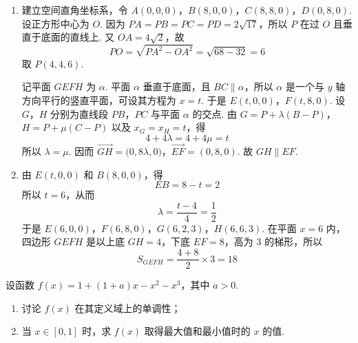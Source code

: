 \begin{solution}
\begin{enumerate}
\item 建立空间直角坐标系，令
\(A(0,0,0)\)，\(B(8,0,0)\)，\(C(8,8,0)\)，\(D(0,8,0)\).
设正方形中心为 \(O\). 因为 \(PA=PB=PC=PD=2\sqrt{17}\)，所以 \(P\) 在过 \(O\) 且垂直于底面的直线上. 又 \(OA=4\sqrt{2}\)，故
\[
PO=\sqrt{PA^2-OA^2}=\sqrt{68-32}=6
\]
取 \(P(4,4,6)\).

记平面 \(GEFH\) 为 \(\alpha\). 平面 \(\alpha\) 垂直于底面，且 \(BC\parallel\alpha\)，所以 \(\alpha\) 是一个与 \(y\) 轴方向平行的竖直平面，可设其方程为 \(x=t\). 于是
\(E(t,0,0)\)，\(F(t,8,0)\).
设 \(G\)，\(H\) 分别为直线段 \(PB\)，\(PC\) 与平面 \(\alpha\) 的交点. 由
\(G=P+\lambda(B-P)\)，\(H=P+\mu(C-P)\)
以及 \(x_G=x_H=t\)，得
\[
4+4\lambda=4+4\mu=t
\]
所以 \(\lambda=\mu\). 因而
\(\overrightarrow{GH} =\bigl(0,8\lambda,0\bigr)\)，\(\overrightarrow{EF}=(0,8,0)\).
故 \(GH\parallel EF\).

\item 由 \(E(t,0,0)\) 和 \(B(8,0,0)\)，得
\[
EB=8-t=2
\]
所以 \(t=6\)，从而
\[
\lambda=\frac{t-4}{4}=\frac{1}{2}
\]
于是
\(E(6,0,0)\)，\(F(6,8,0)\)，\(G(6,2,3)\)，\(H(6,6,3)\).
在平面 \(x=6\) 内，四边形 \(GEFH\) 是以上底 \(GH=4\)，下底 \(EF=8\)，高为 \(3\) 的梯形，所以
\[
S_{GEFH}=\frac{4+8}{2}\times3=18
\]
\end{enumerate}
\end{solution}

\begin{problem}
设函数 \(f(x) = 1 + (1 + a)x - x^2 - x^3\)，其中 \(a > 0\).

\begin{enumerate}
\item 讨论 \(f(x)\) 在其定义域上的单调性；
\item 当 \(x \in [0,1]\) 时，求 \(f(x)\) 取得最大值和最小值时的 \(x\) 的值.
\end{enumerate}
\end{problem}

